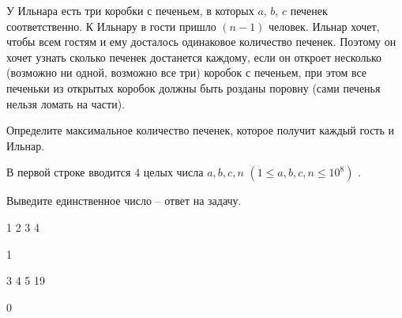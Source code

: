 
У Ильнара есть три коробки с печеньем, в которых $a$, $b$, $c$ печенек соответственно. К Ильнару в гости пришло $(n - 1)$ человек. Ильнар хочет, чтобы всем гостям и ему досталось одинаковое количество печенек. Поэтому он хочет узнать сколько печенек достанется каждому, если он откроет несколько (возможно ни одной, возможно все три) коробок с печеньем, при этом все печеньки из открытых коробок должны быть розданы поровну (сами печенья нельзя ломать на части).

Определите максимальное количество печенек, которое получит каждый гость и Ильнар.


В первой строке вводится $4$ целых числа $a, b, c, n$ $(1 \le a, b, c, n \le 10^8)$ .

\outputfmtSection

Выведите единственное число -- ответ на задачу.

\exampleSection


\begin{myverbbox}[\small]{\vinput}
1 2 3 4
\end{myverbbox}
\begin{myverbbox}[\small]{\voutput}
1
\end{myverbbox}


\begin{myverbbox}[\small]{\vinput}
3 4 5 19
\end{myverbbox}
\begin{myverbbox}[\small]{\voutput}
0
\end{myverbbox}

